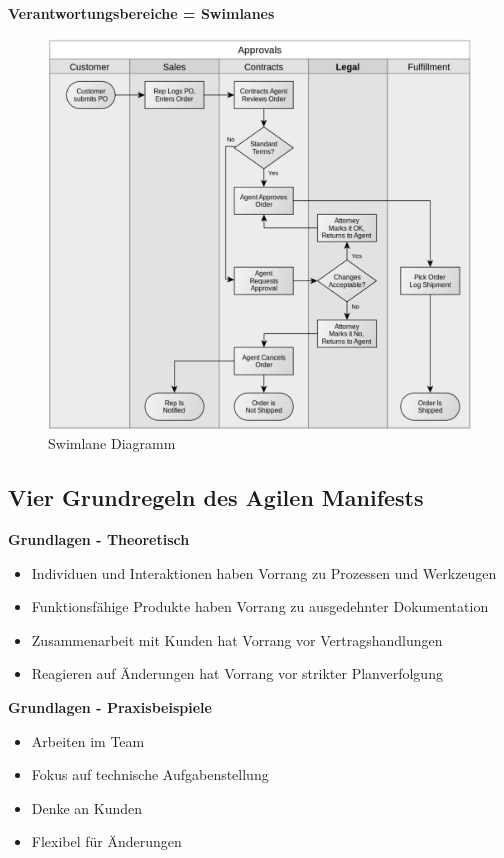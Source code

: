 \textbf{Verantwortungsbereiche = Swimlanes}

\begin{figure}[H]
    \centering
    \includegraphics[width=0.7\linewidth]{Bilder/Teil1_SwimlaneDiagramm.png}
    \caption{Swimlane Diagramm}
\end{figure}

\subsection{Vier Grundregeln des Agilen Manifests}

\textbf{Grundlagen - Theoretisch}
\begin{itemize}
    \item Individuen und Interaktionen haben Vorrang zu Prozessen und Werkzeugen
    \item Funktionsfähige Produkte haben Vorrang zu ausgedehnter Dokumentation
    \item Zusammenarbeit mit Kunden hat Vorrang vor Vertragshandlungen
    \item Reagieren auf Änderungen hat Vorrang vor strikter Planverfolgung
\end{itemize}

\textbf{Grundlagen - Praxisbeispiele}
\begin{itemize}
    \item Arbeiten im Team
    \item Fokus auf technische Aufgabenstellung
    \item Denke an Kunden
    \item Flexibel für Änderungen
\end{itemize}

